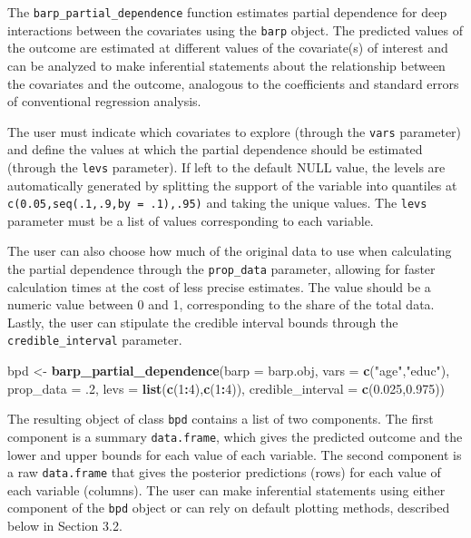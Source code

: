 \documentclass[]{article}
\newenvironment{Shaded}{\begin{snugshade}}{\end{snugshade}}
\newcommand{\KeywordTok}[1]{\textcolor[rgb]{0.13,0.29,0.53}{\textbf{#1}}}
\newcommand{\DataTypeTok}[1]{\textcolor[rgb]{0.13,0.29,0.53}{#1}}
\newcommand{\DecValTok}[1]{\textcolor[rgb]{0.00,0.00,0.81}{#1}}
\newcommand{\FloatTok}[1]{\textcolor[rgb]{0.00,0.00,0.81}{#1}}
\newcommand{\StringTok}[1]{\textcolor[rgb]{0.31,0.60,0.02}{#1}}
\newcommand{\OperatorTok}[1]{\textcolor[rgb]{0.81,0.36,0.00}{\textbf{#1}}}
\newcommand{\NormalTok}[1]{#1}
\begin{document}
The \texttt{barp\_partial\_dependence} function estimates partial
dependence for deep interactions between the covariates using the
\texttt{barp} object. The predicted values of the outcome are estimated
at different values of the covariate(s) of interest and can be analyzed
to make inferential statements about the relationship between the
covariates and the outcome, analogous to the coefficients and standard
errors of conventional regression analysis.

The user must indicate which covariates to explore (through the
\texttt{vars} parameter) and define the values at which the partial
dependence should be estimated (through the \texttt{levs} parameter). If
left to the default NULL value, the levels are automatically generated
by splitting the support of the variable into quantiles at
\texttt{c(0.05,seq(.1,.9,by\ =\ .1),.95)} and taking the unique values.
The \texttt{levs} parameter must be a list of values corresponding to
each variable.

The user can also choose how much of the original data to use when
calculating the partial dependence through the \texttt{prop\_data}
parameter, allowing for faster calculation times at the cost of less
precise estimates. The value should be a numeric value between 0 and 1,
corresponding to the share of the total data. Lastly, the user can
stipulate the credible interval bounds through the
\texttt{credible\_interval} parameter.

\begin{Shaded}
\begin{Highlighting}[]
\NormalTok{bpd <-}\StringTok{ }\KeywordTok{barp_partial_dependence}\NormalTok{(}\DataTypeTok{barp =}\NormalTok{ barp.obj,}
                               \DataTypeTok{vars =} \KeywordTok{c}\NormalTok{(}\StringTok{"age"}\NormalTok{,}\StringTok{"educ"}\NormalTok{),}
                               \DataTypeTok{prop_data =}\NormalTok{ .}\DecValTok{2}\NormalTok{,}
                               \DataTypeTok{levs =} \KeywordTok{list}\NormalTok{(}\KeywordTok{c}\NormalTok{(}\DecValTok{1}\OperatorTok{:}\DecValTok{4}\NormalTok{),}\KeywordTok{c}\NormalTok{(}\DecValTok{1}\OperatorTok{:}\DecValTok{4}\NormalTok{)),}
                               \DataTypeTok{credible_interval =} \KeywordTok{c}\NormalTok{(}\FloatTok{0.025}\NormalTok{,}\FloatTok{0.975}\NormalTok{))}
\end{Highlighting}
\end{Shaded}

The resulting object of class \texttt{bpd} contains a list of two
components. The first component is a summary \texttt{data.frame}, which
gives the predicted outcome and the lower and upper bounds for each
value of each variable. The second component is a raw
\texttt{data.frame} that gives the posterior predictions (rows) for each
value of each variable (columns). The user can make inferential
statements using either component of the \texttt{bpd} object or can rely
on default plotting methods, described below in Section 3.2.
\end{document}
